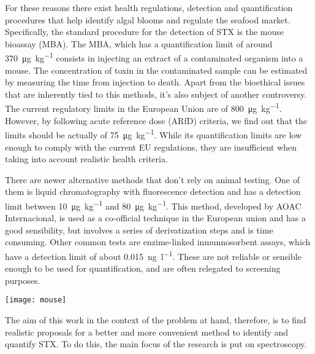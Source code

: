 For these reasons there exist health regulations, detection and quantification procedures that help identify algal blooms and regulate the seafood market.
Specifically, the standard procedure for the detection of STX is the mouse bioassay (MBA).
The MBA, which has a quantification limit of around \SI{370}{\micro\gram\per\kilo\gram} consists in injecting an extract of a contaminated organism into a mouse.
The concentration of toxin in the contaminated sample can be estimated by measuring the time from injection to death.\cite{who84}
Apart from the bioethical issues that are inherently tied to this methods, it's also subject of another controversy.
The current regulatory limits in the European Union are of \SI{800}{\micro\gram\per\kilo\gram}.
However, by following acute reference dose (ARfD) criteria, we find out that the limits should be actually of \SI{75}{\micro\gram\per\kilo\gram}.\cite{efsa09}
While its quantification limits are low enough to comply with the current EU regulations, they are insufficient when taking into account realistic health criteria.

There are newer alternative methods that don't rely on animal testing.
One of them is liquid chromatography with fluorescence detection and has a detection limit between \SI{10}{\micro\gram\per\kilo\gram} and \SI{80}{\micro\gram\per\kilo\gram}.\cite{eu17,aoac16}
This method, developed by AOAC Internacional, is used as a co-official technique in the European union and has a good sensibility, but involves a series of derivatization steps and is time consuming.
Other common tests are enzime-linked inmunnosorbent assays, which have a detection limit of about \SI{0.015}{\nano\gram\per\litre}.\cite{wharton17}
These are not reliable or sensible enough to be used for quantification, and are often relegated to screening purposes.

\begin{marginfigure}
    \texttt{[image: mouse]}
\end{marginfigure}

The aim of this work in the context of the problem at hand, therefore, is to find realistic proposals for a better and more convenient method to identify and quantify STX.
To do this, the main focus of the research is put on spectroscopy.

